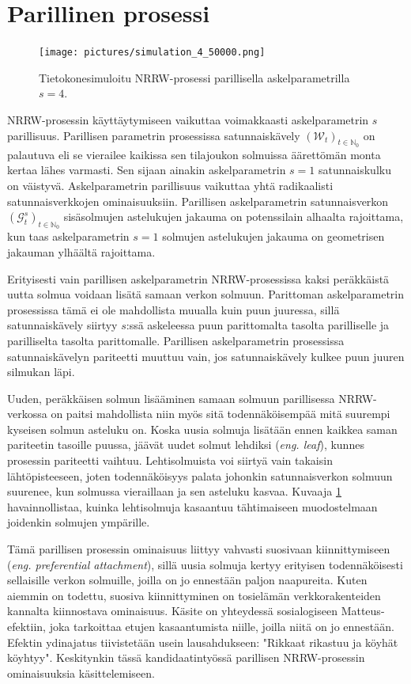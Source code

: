 \documentclass[finnish, 12pt, a4paper, sci, utf8, pdfa]{aaltothesis}
\newcommand{\N}{\mathbb{N}}
\newcommand{\Grandom}{\mathcal{G}}
\newcommand{\Wrandom}{\mathcal{W}}
\begin{document}
\section{Parillinen prosessi}

\begin{figure}[htb]
\centering
\texttt{[image: pictures/simulation\_4\_50000.png]}
   \caption{Tietokonesimuloitu NRRW-prosessi parillisella askelparametrilla $ s = 4 $. \label{figure:oma_simulaatio}}
\end{figure}

NRRW-prosessin käyttäytymiseen vaikuttaa voimakkaasti askelparametrin $ s $ parillisuus. Parillisen parametrin prosessissa satunnaiskävely $ (\Wrandom_{t})_{t \in \N_{0}} $ on palautuva eli se vierailee kaikissa sen tilajoukon solmuissa äärettömän monta kertaa lähes varmasti. Sen sijaan ainakin askelparametrin $ s = 1 $ satunnaiskulku on väistyvä. Askelparametrin parillisuus vaikuttaa yhtä radikaalisti satunnaisverkkojen ominaisuuksiin. Parillisen askelparametrin satunnaisverkon $ (\Grandom^{s}_{t})_{t \in \N_{0}} $ sisäsolmujen astelukujen jakauma on potenssilain alhaalta rajoittama, kun taas askelparametrin $ s = 1 $ solmujen astelukujen jakauma on geometrisen jakauman ylhäältä rajoittama.

Erityisesti vain parillisen askelparametrin NRRW-prosessissa kaksi peräkkäistä uutta solmua voidaan lisätä samaan verkon solmuun. Parittoman askelparametrin prosessissa tämä ei ole mahdollista muualla kuin puun juuressa, sillä satunnaiskävely siirtyy $ s $:ssä askeleessa puun parittomalta tasolta parilliselle ja parilliselta tasolta parittomalle. Parillisen askelparametrin prosessissa satunnaiskävelyn pariteetti muuttuu vain, jos satunnaiskävely kulkee puun juuren silmukan läpi.

Uuden, peräkkäisen solmun lisääminen samaan solmuun parillisessa NRRW-verkossa on paitsi mahdollista niin myös sitä todennäköisempää mitä suurempi kyseisen solmun asteluku on. Koska uusia solmuja lisätään ennen kaikkea saman pariteetin tasoille puussa, jäävät uudet solmut lehdiksi (\textit{eng. leaf}), kunnes prosessin pariteetti vaihtuu. Lehtisolmuista voi siirtyä vain takaisin lähtöpisteeseen, joten todennäköisyys palata johonkin satunnaisverkon solmuun suurenee, kun solmussa vieraillaan ja sen asteluku kasvaa. Kuvaaja \ref{figure:oma_simulaatio} havainnollistaa, kuinka lehtisolmuja kasaantuu tähtimaiseen muodostelmaan joidenkin solmujen ympärille.

Tämä parillisen prosessin ominaisuus liittyy vahvasti suosivaan kiinnittymiseen (\textit{eng. preferential attachment}), sillä uusia solmuja kertyy erityisen todennäköisesti sellaisille verkon solmuille, joilla on jo ennestään paljon naapureita. Kuten aiemmin on todettu, suosiva kiinnittyminen on tosielämän verkkorakenteiden kannalta kiinnostava ominaisuus. Käsite on yhteydessä sosialogiseen Matteus-efektiin, joka tarkoittaa etujen kasaantumista niille, joilla niitä on jo ennestään. Efektin ydinajatus tiivistetään usein lausahdukseen: "Rikkaat rikastuu ja köyhät köyhtyy". Keskitynkin tässä kandidaatintyössä parillisen NRRW-prosessin ominaisuuksia käsittelemiseen.
\end{document}

